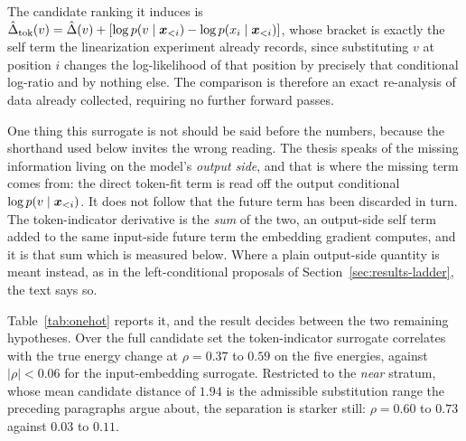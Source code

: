 The candidate ranking it induces is $\hat{\Delta}_{\text{tok}}(v) = \hat{\Delta}(v) + [\log p(v \mid \bm{x}_{<i}) - \log p(x_i \mid \bm{x}_{<i})]$, whose bracket is exactly the self term the linearization experiment already records, since substituting $v$ at position $i$ changes the log-likelihood of that position by precisely that conditional log-ratio and by nothing else. The comparison is therefore an exact re-analysis of data already collected, requiring no further forward passes.

One thing this surrogate is not should be said before the numbers, because the shorthand used below invites the wrong reading. The thesis speaks of the missing information living on the model's \emph{output side}, and that is where the missing term comes from: the direct token-fit term is read off the output conditional $\log p(v \mid \bm{x}_{<i})$. It does not follow that the future term has been discarded in turn. The token-indicator derivative is the \emph{sum} of the two, an output-side self term added to the same input-side future term the embedding gradient computes, and it is that sum which is measured below. Where a plain output-side quantity is meant instead, as in the left-conditional proposals of Section~\ref{sec:results-ladder}, the text says so.

Table~\ref{tab:onehot} reports it, and the result decides between the two remaining hypotheses. Over the full candidate set the token-indicator surrogate correlates with the true energy change at $\rho = 0.37$ to $0.59$ on the five energies, against $|\rho| < 0.06$ for the input-embedding surrogate. Restricted to the \emph{near} stratum, whose mean candidate distance of $1.94$ is the admissible substitution range the preceding paragraphs argue about, the separation is starker still: $\rho = 0.60$ to $0.73$ against $0.03$ to $0.11$.

